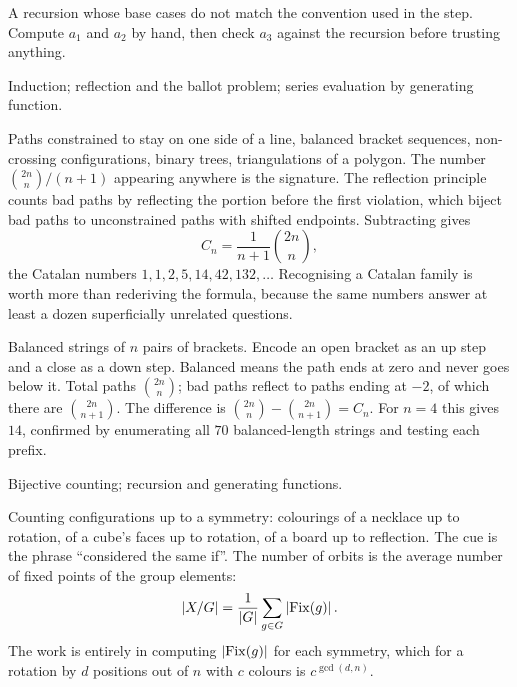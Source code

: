 \begin{trap}
A recursion whose base cases do not match the convention used in the step. Compute $a_{1}$ and $a_{2}$ by hand, then check $a_{3}$ against the recursion before trusting anything.
\end{trap}

\begin{seealsob}Induction; reflection and the ballot problem; series evaluation by generating function.\end{seealsob}

\cue Paths constrained to stay on one side of a line, balanced bracket sequences, non-crossing configurations, binary trees, triangulations of a polygon. The number $\binom{2n}{n}/(n+1)$ appearing anywhere is the signature.
\method The reflection principle counts bad paths by reflecting the portion before the first violation, which biject bad paths to unconstrained paths with shifted endpoints. Subtracting gives
\[
C_{n}=\frac{1}{n+1}\binom{2n}{n},
\]
the Catalan numbers $1,1,2,5,14,42,132,\ldots$ Recognising a Catalan family is worth more than rederiving the formula, because the same numbers answer at least a dozen superficially unrelated questions.

\begin{worked}
Balanced strings of $n$ pairs of brackets. Encode an open bracket as an up step and a close as a down step. Balanced means the path ends at zero and never goes below it. Total paths $\binom{2n}{n}$; bad paths reflect to paths ending at $-2$, of which there are $\binom{2n}{n+1}$. The difference is $\binom{2n}{n}-\binom{2n}{n+1}=C_{n}$. For $n=4$ this gives $14$, confirmed by enumerating all $70$ balanced-length strings and testing each prefix.
\end{worked}

\begin{seealsob}Bijective counting; recursion and generating functions.\end{seealsob}

\cue Counting configurations up to a symmetry: colourings of a necklace up to rotation, of a cube's faces up to rotation, of a board up to reflection. The cue is the phrase ``considered the same if''.
\method The number of orbits is the average number of fixed points of the group elements:
\[
\left\lvert X/G\right\rvert=\frac{1}{\left\lvert G\right\rvert}\sum_{g\in G}\left\lvert \mathrm{Fix}(g)\right\rvert.
\]
The work is entirely in computing $\left\lvert \mathrm{Fix}(g)\right\rvert$ for each symmetry, which for a rotation by $d$ positions out of $n$ with $c$ colours is $c^{\gcd(d,n)}$.

